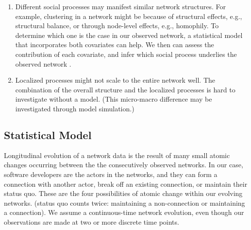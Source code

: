 \documentclass[11pt]{report}
\begin{document}
\begin{enumerate}
\item Different social processes may manifest similar network structures. For example, clustering in a network might be because of structural effects, e.g., structural balance, or through node-level effects, e.g., homophily. To determine which one is the case in our observed network, a statistical model that incorporates both covariates can help. We then can assess the contribution of each covariate, and infer which social process underlies the observed network \cite{Robins}. 

\item  Localized processes might not scale to the entire network well. The combination of the overall structure and the localized processes is hard to investigate without a model. (This micro-macro difference may be investigated through model simulation.)\cite{Robins}

\end{enumerate}


%

\subsection{Statistical Model}
\label{statisticalModel}

Longitudinal evolution of a network data is the result of many small atomic changes occurring between the the consecutively observed networks. In our case, software developers are the actors in the networks, and they can form a connection with another actor, break off an existing connection, or maintain their status quo. These are the four possibilities of atomic change within our evolving networks. (status quo counts twice: maintaining a non-connection or maintaining a connection). We assume a continuous-time network evolution, even though our observations are made at two or more discrete time points. 
\end{document}
